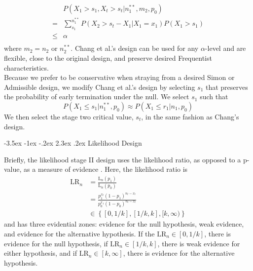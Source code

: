 \documentclass[12pt]{report}\usepackage[]{graphicx}\usepackage[]{color}
\makeatletter
\newlength{\li}\setlength{\li}{14.48pt}
\newlength{\di}\setlength{\di}{-3.5mm}
\renewcommand\subsection{\@startsection {subsection}{2}{\z@}%
                                   {-3.5ex \@plus -1ex \@minus -.2ex}%
                                   {2.3ex \@plus.2ex}%
                                   {\noindent \large \fontfamily{qcs}\selectfont }}
\makeatother
\begin{document}
\begin{equation*}
\begin{aligned}
& P(X_1 > s_1, X_t > s_t | n_1^{\ast\ast}, m_2, p_0) \\
= & \sum_{s_1}^{n_1^{\ast\ast}} P(X_2 > s_t - X_1 | X_1 = x_1) P(X_1 > s_1) \\
 \leq & \alpha \\
\end{aligned}
\end{equation*}
where $m_2 = n_2$ or $n_2^{\ast\ast}$. 
Chang et al.'s design can be used for any $\alpha$-level and are flexible, close to the original design, and preserve desired Frequentist characteristics. \\
Because we prefer to be conservative when straying from a desired Simon or Admissible design, we modify Chang et al.'s design by selecting $s_1$ that preserves the probability of early termination under the null. We select $s_1$ such that $$P(X_1 \leq s_1 | n_1^{\ast\ast}, p_0) \approx P(X_1 \leq r_1 | n_1, p_0)$$ We then select the stage two critical value, $s_t$, in the same fashion as Chang's design.  

\subsection{Likelihood Design}

Briefly, the likelihood stage II design uses the likelihood ratio, as opposed to a p-value, as a measure of evidence \cite{Blume}. Here, the likelihood ratio is 
\begin{equation*}
\begin{aligned}
\mbox{LR}_n & = \frac{\mbox{L}_n(p_1)}{\mbox{L}_n(p_0)} \\
&= \frac{p_1^{x_t}(1-p_1)^{n_t-x_t}}{p_0^{x_1}(1-p_0)^{n_t-x_t}} \\
& \in \left\{[0, 1/k], [1/k,k], [k, \infty)\right\}
\end{aligned}
\end{equation*}
and has three evidential zones: evidence for the null hypothesis, weak evidence, and evidence for the alternative hypothesis. If the $\mbox{LR}_n \in [0, 1/k]$, there is evidence for the null hypothesis, if $\mbox{LR}_n \in [1/k,k]$, there is weak evidence for either hypothesis, and if $\mbox{LR}_n \in [k,\infty]$, there is evidence for the alternative hypothesis. \\
\end{document}
